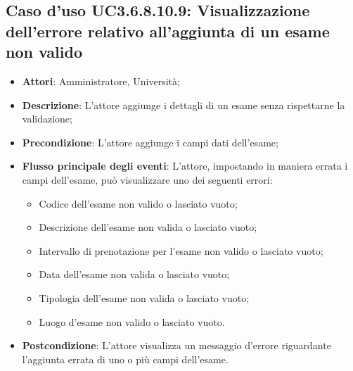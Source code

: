 \subsection{Caso d'uso \texorpdfstring{UC3.6.8.10.9}{UC3.6.8.10.9}: Visualizzazione dell'errore relativo all’aggiunta di un esame non valido}
\begin{itemize}
\item \textbf{Attori}: Amministratore, Università;
\item \textbf{Descrizione}: L'attore aggiunge i dettagli di un esame senza rispettarne la validazione;

\item \textbf{Precondizione}: L'attore aggiunge i campi dati dell'esame;

\item \textbf{Flusso principale degli eventi}: L'attore, impostando in maniera errata i campi dell'esame, può visualizzare uno dei seguenti errori:
\begin{itemize}
\item Codice dell’esame non valido o lasciato vuoto;
\item Descrizione dell’esame non valida o lasciato vuoto;
\item Intervallo di prenotazione per l’esame non valido o lasciato vuoto;
\item Data dell’esame non valida o lasciato vuoto;
\item Tipologia dell’esame non valida o lasciato vuoto;
\item Luogo d’esame non valido o lasciato vuoto.
\end{itemize}
\item \textbf{Postcondizione}: L'attore visualizza un messaggio d'errore riguardante l'aggiunta errata di uno o più campi dell'esame.

\end{itemize}

